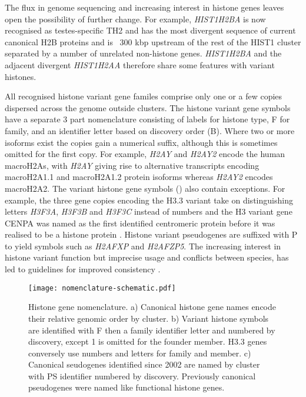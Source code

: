 	The flux in genome sequencing and increasing interest in histone genes 
	leaves open the possibility of further change. 
	For example, \textit{HIST1H2BA} is now recognised as testes-specific TH2  
	and has the most divergent sequence of current canonical H2B proteins 
	and is ~300 kbp upstream of the rest of the HIST1 cluster 
	separated by a number of unrelated non-histone genes. 
	\textit{HIST1H2BA} and the adjacent divergent \textit{HIST1H2AA} therefore share some features with variant histones.
	
	All recognised histone variant gene familes comprise only one or a few copies 
	dispersed across the genome outside clusters.
	The histone variant gene symbols have a separate 3 part nomenclature 
	consisting of labels for histone type, F for family, 
	and an identifier letter based on discovery order (B).
	Where two or more isoforms exist the copies gain a numerical suffix, 
	although this is sometimes omitted for the first copy. 
	For example, \textit{H2AY} and \textit{H2AY2} encode the human macroH2As, 
	with \textit{H2AY} giving rise to alternative transcripts encoding macroH2A1.1 and macroH2A1.2 protein isoforms 
	whereas \textit{H2AY2} encodes macroH2A2.
	The variant histone gene symbols () also contain exceptions. 
	For example, the three gene copies encoding the H3.3 variant 
	take on distinguishing letters \textit{H3F3A}, \textit{H3F3B} and \textit{H3F3C} instead of numbers 
	and the H3 variant gene CENPA was named as the first identified centromeric protein \cite{CENPA-first-report} 
	before it was realised to be a histone protein \citep{CENPA-copurifies-histones, CENPA-sequence-analysis}. 
	Histone variant pseudogenes are suffixed with P to yield symbols such as \textit{H2AFXP} and \textit{H2AFZP5}.
	The increasing interest in histone variant function 
	but imprecise usage and conflicts between species, 
	has led to guidelines for improved consistency .

    \begin{figure*}
      \centering
      \texttt{[image: nomenclature-schematic.pdf]}
      \caption{Histone gene nomenclature. 
	  a) Canonical histone gene names encode their relative genomic order by cluster. 
	  b) Variant histone symbols are identified with F then a family identifier letter
	  and numbered by discovery, except 1 is omitted for the founder member. 
	  H3.3 genes conversely use numbers and letters for family and member.
	  c) Canonical seudogenes identified since 2002 are named by cluster with PS identifier numbered by discovery. 
	  Previously canonical pseudogenes were named like functional histone genes.}
      \label{fig:nomenclature}
    \end{figure*}

